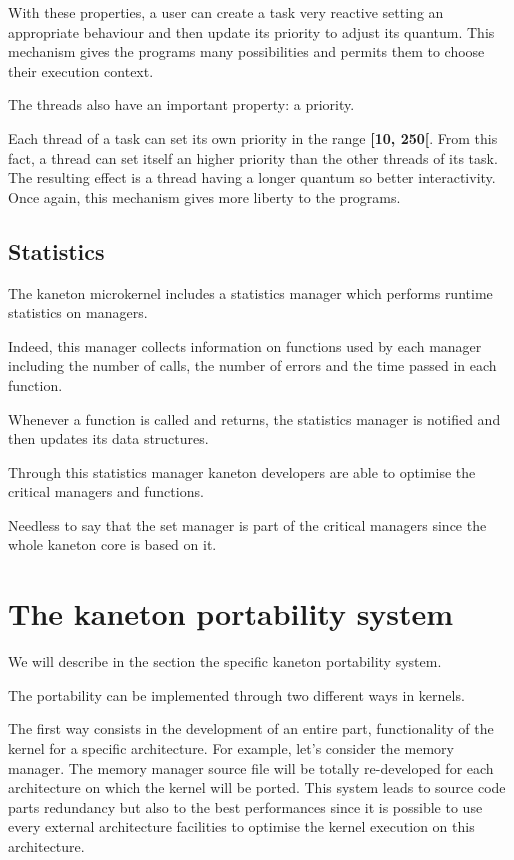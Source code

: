 \begin{multicols}{2}
With these properties, a user can create a task very reactive setting an
appropriate behaviour and then update its priority to adjust its quantum.
This mechanism gives the programs many possibilities and permits them to
choose their execution context.

The threads also have an important property: a priority.

Each thread of a task can set its own priority in the range \textbf{[10, 250[}.
From this fact, a thread can set itself an higher priority than the other
threads of its task. The resulting effect is a thread having a longer quantum
so better interactivity. Once again, this mechanism gives more liberty to the
programs.

%
%

\subsection{Statistics}

The kaneton microkernel includes a statistics manager which performs
runtime statistics on managers.

Indeed, this manager collects information on functions used by each manager
including the number of calls, the number of errors and the time passed
in each function.

Whenever a function is called and returns, the statistics manager is notified
and then updates its data structures.

Through this statistics manager kaneton developers are able to optimise
the critical managers and functions.

Needless to say that the set manager is part of the critical managers since
the whole kaneton core is based on it.

%
%

\section{The kaneton portability system}

We will describe in the section the specific kaneton portability system.

The portability can be implemented through two different ways in kernels.

The first way consists in the development of an entire part, functionality
of the kernel for a specific architecture. For example, let's consider the
memory manager. The memory manager source file will be totally re-developed
for each architecture on which the kernel will be ported. This system leads
to source code parts redundancy but also to the best performances since
it is possible to use every external architecture facilities to optimise
the kernel execution on this architecture.


\end{multicols}
